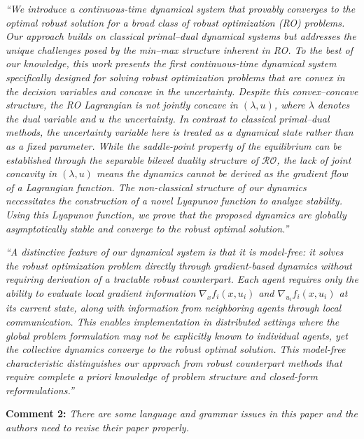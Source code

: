 \documentclass[journal,twoside,web]{ieeecolor}
\begin{document}
{\color{revisionblue}\textit{``We introduce a continuous-time dynamical system that provably converges to the optimal robust solution for a broad class of robust optimization (RO) problems. Our approach builds on classical primal--dual dynamical systems \cite{arrow1958,feijer2010} but addresses the unique challenges posed by the min--max structure inherent in RO. To the best of our knowledge, this work presents the first continuous-time dynamical system specifically designed for solving robust optimization problems that are convex in the decision variables and concave in the uncertainty. Despite this convex--concave structure, the RO Lagrangian is not jointly concave in $(\lambda,u)$, where $\lambda$ denotes the dual variable and $u$ the uncertainty. In contrast to classical primal--dual methods, the uncertainty variable here is treated as a dynamical state rather than as a fixed parameter. While the saddle-point property of the equilibrium can be established through the separable bilevel duality structure of $\mathcal{RO}$, the lack of joint concavity in $(\lambda,u)$ means the dynamics cannot be derived as the gradient flow of a Lagrangian function. The non-classical structure of our dynamics necessitates the construction of a novel Lyapunov function to analyze stability. Using this Lyapunov function, we prove that the proposed dynamics are globally asymptotically stable and converge to the robust optimal solution.''}}

{\color{revisionblue}\textit{``A distinctive feature of our dynamical system is that it is \emph{model-free}: it solves the robust optimization problem directly through gradient-based dynamics without requiring derivation of a tractable robust counterpart. Each agent requires only the ability to evaluate local gradient information $\nabla_x f_i(x,u_i)$ and $\nabla_{u_i} f_i(x,u_i)$ at its current state, along with information from neighboring agents through local communication. This enables implementation in distributed settings where the global problem formulation may not be explicitly known to individual agents, yet the collective dynamics converge to the robust optimal solution. This model-free characteristic distinguishes our approach from robust counterpart methods that require complete a priori knowledge of problem structure and closed-form reformulations.''}}

\vspace{0.5em}
\noindent\textbf{Comment 2:} \textit{There are some language and grammar issues in this paper and the authors need to revise their paper properly.}
\end{document}
